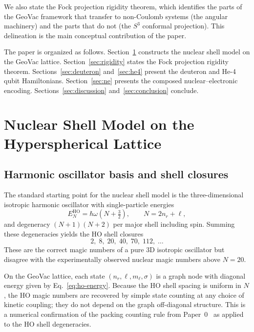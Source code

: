 \documentclass[twocolumn,prc,amsmath,amssymb,superscriptaddress]{revtex4-2}
\begin{document}
We also state the Fock projection rigidity theorem, which identifies
the parts of the GeoVac framework that transfer to non-Coulomb systems
(the angular machinery) and the parts that do not (the $S^3$ conformal
projection). This delineation is the main conceptual contribution of
the paper.

The paper is organized as follows. Section~\ref{sec:shell} constructs
the nuclear shell model on the GeoVac lattice. Section~\ref{sec:rigidity}
states the Fock projection rigidity theorem. Sections~\ref{sec:deuteron}
and~\ref{sec:he4} present the deuteron and He-4 qubit Hamiltonians.
Section~\ref{sec:ne} presents the composed nuclear--electronic
encoding. Sections~\ref{sec:discussion} and~\ref{sec:conclusion}
conclude.

\section{Nuclear Shell Model on the Hyperspherical Lattice}
\label{sec:shell}

\subsection{Harmonic oscillator basis and shell closures}

The standard starting point for the nuclear shell model is the
three-dimensional isotropic harmonic oscillator with single-particle
energies
\begin{equation}
  E_N^{\mathrm{HO}} = \hbar\omega \left(N + \tfrac{3}{2}\right),
  \qquad
  N = 2 n_r + \ell,
\label{eq:ho-energy}
\end{equation}
and degeneracy $(N+1)(N+2)$ per major shell including spin. Summing
these degeneracies yields the HO shell closures
\[
  2, \; 8, \; 20, \; 40, \; 70, \; 112, \; \ldots
\]
These are the correct magic numbers of a pure 3D isotropic oscillator
but disagree with the experimentally observed nuclear magic numbers
above $N=20$.

On the GeoVac lattice, each state $(n_r, \ell, m_\ell, \sigma)$ is a
graph node with diagonal energy given by
Eq.~\eqref{eq:ho-energy}. Because the HO shell spacing is uniform in
$N$, the HO magic numbers are recovered by simple state counting at any
choice of kinetic coupling; they do not depend on the graph off-diagonal
structure. This is a numerical confirmation of the packing counting
rule from Paper~0~\cite{Paper0} as applied to the HO shell degeneracies.
\end{document}
